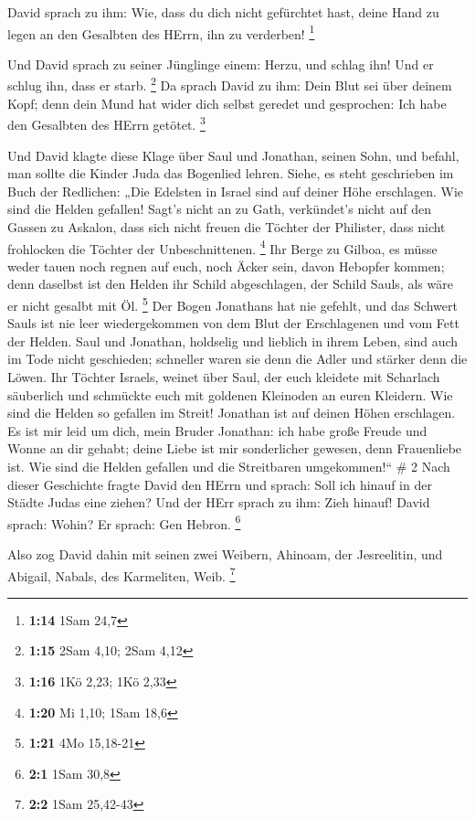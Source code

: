  David sprach zu ihm: Wie, dass du dich nicht gefürchtet
hast, deine Hand zu legen an den Gesalbten des HErrn, ihn zu verderben!
\footnote{\textbf{1:14} 1Sam 24,7}

 Und David sprach zu seiner Jünglinge einem: Herzu, und
schlag ihn! Und er schlug ihn, dass er starb. \footnote{\textbf{1:15}
  2Sam 4,10; 2Sam 4,12}  Da sprach David zu ihm: Dein Blut
sei über deinem Kopf; denn dein Mund hat wider dich selbst geredet und
gesprochen: Ich habe den Gesalbten des HErrn getötet. \footnote{\textbf{1:16}
  1Kö 2,23; 1Kö 2,33}

 Und David klagte diese Klage über Saul und Jonathan,
seinen Sohn,  und befahl, man sollte die Kinder Juda das
Bogenlied lehren. Siehe, es steht geschrieben im Buch der Redlichen:
 „Die Edelsten in Israel sind auf deiner Höhe erschlagen.
Wie sind die Helden gefallen!  Sagt's nicht an zu Gath,
verkündet's nicht auf den Gassen zu Askalon, dass sich nicht freuen die
Töchter der Philister, dass nicht frohlocken die Töchter der
Unbeschnittenen. \footnote{\textbf{1:20} Mi 1,10; 1Sam 18,6}
 Ihr Berge zu Gilboa, es müsse weder tauen noch regnen auf
euch, noch Äcker sein, davon Hebopfer kommen; denn daselbst ist den
Helden ihr Schild abgeschlagen, der Schild Sauls, als wäre er nicht
gesalbt mit Öl. \footnote{\textbf{1:21} 4Mo 15,18-21}  Der
Bogen Jonathans hat nie gefehlt, und das Schwert Sauls ist nie leer
wiedergekommen von dem Blut der Erschlagenen und vom Fett der Helden.
 Saul und Jonathan, holdselig und lieblich in ihrem Leben,
sind auch im Tode nicht geschieden; schneller waren sie denn die Adler
und stärker denn die Löwen.  Ihr Töchter Israels, weinet
über Saul, der euch kleidete mit Scharlach säuberlich und schmückte euch
mit goldenen Kleinoden an euren Kleidern.  Wie sind die
Helden so gefallen im Streit! Jonathan ist auf deinen Höhen erschlagen.
 Es ist mir leid um dich, mein Bruder Jonathan: ich habe
große Freude und Wonne an dir gehabt; deine Liebe ist mir sonderlicher
gewesen, denn Frauenliebe ist.  Wie sind die Helden
gefallen und die Streitbaren umgekommen!{}`` \# 2  Nach
dieser Geschichte fragte David den HErrn und sprach: Soll ich hinauf in
der Städte Judas eine ziehen? Und der HErr sprach zu ihm: Zieh hinauf!
David sprach: Wohin? Er sprach: Gen Hebron. \footnote{\textbf{2:1} 1Sam
  30,8}

 Also zog David dahin mit seinen zwei Weibern, Ahinoam, der
Jesreelitin, und Abigail, Nabals, des Karmeliten, Weib. \footnote{\textbf{2:2}
  1Sam 25,42-43}

